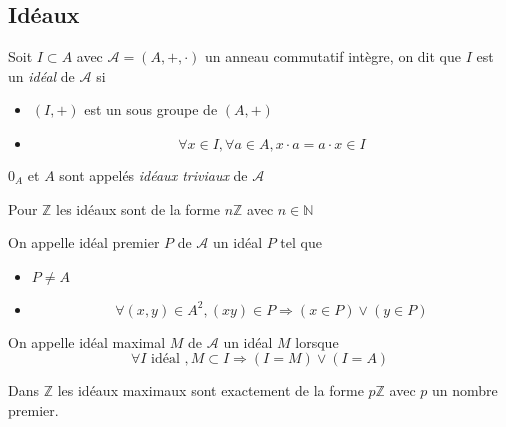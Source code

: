 \documentclass[11pt,colorlinks]{book}
\theoremstyle{mytheoremstyle}
\theoremstyle{mytheoremstyle}
\theoremstyle{mytheoremstyle}
\theoremstyle{mytheoremstyle}
\theoremstyle{mytheoremstyle}
\theoremstyle{mytheoremstyle}
\theoremstyle{mytheoremstyle}
\theoremstyle{mytheoremstyle}
\theoremstyle{myproblemstyle}
\def\mbb#1{\mathbb{#1}}
\def\bN{\mbb{N}}
\def\bZ{\mbb{Z}}
\begin{document}
\subsection{Idéaux}
\begin{definition}
  Soit $I \subset A$ avec $\mathcal A = (A,+,\cdot)$ un anneau commutatif intègre, on dit que $I$ est un \textit{idéal} de $\mathcal A$ si 
  \begin{itemize}
    \item $(I,+)$ est un sous groupe de $(A,+)$
    \item \begin{equation*}
      \forall x \in I, \forall a \in A, x\cdot a = a\cdot x \in I
    \end{equation*}
  \end{itemize}
\end{definition}
\begin{rmq}
  ${0_A}$ et $A$ sont appelés \textit{idéaux triviaux} de $\mathcal A$
\end{rmq}
\begin{ex}
  Pour $\bZ$ les idéaux sont de la forme $n\bZ$ avec $n \in \bN$
\end{ex}
\begin{definition}
  On appelle idéal premier $P$ de $\mathcal A$ un idéal $P$ tel que 
  \begin{itemize}
    \item $P \not= A$
    \item \begin{equation*}
      \forall (x,y) \in A^2, (xy) \in P \Rightarrow (x \in P) \vee (y \in P)
    \end{equation*}
  \end{itemize}
\end{definition}
\begin{definition}
  On appelle idéal maximal $M$ de $\mathcal A$ un idéal $M$ lorsque 
  \begin{equation*}
    \forall I \text{ idéal }, M \subset I \Rightarrow (I = M) \vee (I = A)
  \end{equation*}
\end{definition}
\begin{ex}
  Dans $\bZ$ les idéaux maximaux sont exactement de la forme $p\bZ$ avec $p$ un nombre premier.
\end{ex}
\end{document}
